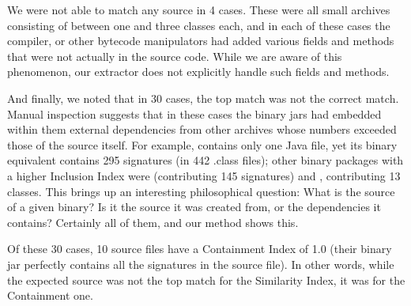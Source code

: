 We were not able to match any source in 4 cases.  These were all small
archives consisting of between one and three classes each, and in each of
these cases the compiler, or other bytecode manipulators had added various
fields and methods that were not actually in the source code.  While we are
aware of this phenomenon, our extractor does not explicitly handle such
fields and methods.


And finally, we noted that in 30 cases, the top match was not the correct
match.  Manual inspection suggests that in these cases the binary jars had
embedded within them external dependencies from other archives whose
numbers exceeded those of the source itself.  For example,
 contains only one
Java file, yet its binary equivalent 
contains 295 signatures (in 442 .class files); other binary
packages with a higher Inclusion Index were 
(contributing 145 signatures) and , contributing 13
classes.  This brings up an interesting philosophical question: What is the
source of a given binary?  Is it the source it was created from, or the
dependencies it contains?  Certainly all of them, and our method shows
this. 

Of these 30 cases, 10 source files have a Containment Index of 1.0 (their
binary jar perfectly contains all the signatures in the source file). In
other words, while the expected source was not the top match for the
Similarity Index, it was for the Containment one.


  

